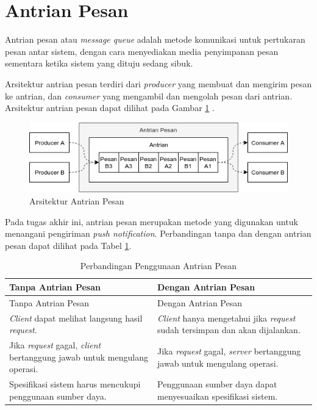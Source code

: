 \section{Antrian Pesan}
\par Antrian pesan atau \textit{message queue} adalah metode komunikasi untuk pertukaran pesan antar sistem, dengan cara menyediakan media penyimpanan pesan sementara ketika sistem yang dituju sedang sibuk.
\par Arsitektur antrian pesan terdiri dari \textit{producer} yang membuat dan mengirim pesan ke antrian, dan \textit{consumer} yang mengambil dan mengolah pesan dari antrian. Arsitektur antrian pesan dapat dilihat pada Gambar \ref{img:arsitektur-mq_pnt} \cite{message-queue-online}.
\begin{figure}[H]
	\centering\includegraphics[width=1\textwidth]{bab2/img/arsitektur-mq_pnt.jpg}
	\caption{Arsitektur Antrian Pesan}
	\label{img:arsitektur-mq_pnt}
\end{figure}
\par Pada tugas akhir ini, antrian pesan merupakan metode yang digunakan untuk menangani pengiriman \textit{push notification}. Perbandingan tanpa dan dengan antrian pesan dapat dilihat pada Tabel \ref{t:perbandingan-antrian-pesan}.
\begin{longtable}{|p{4.5cm}|p{4.5cm}|}
	\caption{Perbandingan Penggunaan Antrian Pesan} \label{t:perbandingan-antrian-pesan} \\ \hline
	\rowcolor{lightgray} Tanpa Antrian Pesan & Dengan Antrian Pesan \\ \hline
	\endfirsthead
	\hline
	\rowcolor{lightgray} Tanpa Antrian Pesan & Dengan Antrian Pesan \\ \hline
	\endhead
	\textit{Client} dapat melihat langsung hasil \textit{request}. & \textit{Client} hanya mengetahui jika \textit{request} sudah tersimpan dan akan dijalankan. \\ \hline
	Jika \textit{request} gagal, \textit{client} bertanggung jawab untuk mengulang operasi. & Jika \textit{request} gagal, \textit{server} bertanggung jawab untuk mengulang operasi. \\ \hline
	Spesifikasi sistem harus mencukupi penggunaan sumber daya. & Penggunaan sumber daya dapat menyesuaikan spesifikasi sistem. \\ \hline
\end{longtable}

